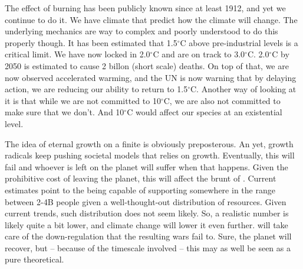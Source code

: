 The effect of burning  has been publicly known since at least 1912\cite{remarkableweather}, and yet we continue to do it. We have climate  that predict how the climate will change. The underlying mechanics are way to complex and poorly understood to do this properly though. It has been estimated that 1.5$^\circ$C above pre-industrial levels is a critical limit. We have now locked in 2.0$^\circ$C and are on track to 3.0$^\circ$C. 2.0$^\circ$C by 2050 is estimated to cause 2 billon (short scale) deaths. On top of that, we are now observed accelerated warming\cite{Foster2026}, and the UN is now warning that by delaying action, we are reducing our ability to return to 1.5$^\circ$C\cite{unep2026limiting}. Another way of looking at it is that while we are not committed to 10$^\circ$C, we are also not committed to make sure that we don't. And 10$^\circ$C would affect our species at an existential level.

The idea of eternal growth on a finite  is obviously preposterous. An yet, growth radicals keep pushing societal models that relies on growth. Eventually, this will fail and whoever is left on the planet will suffer when that happens. Given the prohibitive cost of leaving the planet, this will affect the brunt of . Current estimates point to the  being capable of supporting somewhere in the range between 2-4B people given a well-thought-out distribution of resources\cite{Dasgupta+2019,lianos,planetof3b,doi:10.1177/00368504231201372}. Given current trends, such distribution does not seem likely. So, a realistic number is likely quite a bit lower, and climate change will lower it even further.  will take care of the down-regulation that the resulting wars fail to. Sure, the planet will recover, but -- because of the timescale involved -- this may as well be seen as a pure theoretical.

